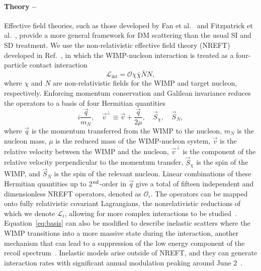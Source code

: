 \paragraph{Theory --\label{sec:theory}}
Effective field theories, such as those developed by Fan et al.~\cite{Fan_2010} and Fitzpatrick et al.~\cite{Fitzpatrick:EFT}, provide a more general framework for DM scattering than the usual SI and SD treatment.
We use the non-relativistic effective field theory (NREFT) developed in Ref.~\cite{Fitzpatrick:EFT}, in which the WIMP-nucleon interaction is treated as a four-particle contact interaction
\begin{equation}
    \mathcal{L}_\text{int} = \mathcal{O}\chi\bar{\chi}\bar{N}N,
\end{equation}
where $\chi$ and $N$ are non-relativistic fields for the WIMP and target nucleon, respectively.
Enforcing momentum conservation and Galilean invariance \cite{Fitzpatrick:EFT}  reduces the operators to a basis of four Hermitian quantities
\begin{equation}
i \frac{\vec{q}}{m_N}, \quad \vec{v}^\perp \equiv \vec{v} + \frac{\vec{q}}{2\mu}, \quad \vec{S}_{\chi}, \quad \vec{S}_{N},
\label{eq:basis}
\end{equation}
where $\vec{q}$ is the momentum transferred from the WIMP to the nucleon, $m_N$ is the nucleon mass, $\mu$ is the reduced mass of the WIMP-nucleon system, $\vec{v}$ is the relative velocity between the WIMP and the nucleon, $\vec{v}^\perp$ is the component of the relative velocity  perpendicular to the momentum transfer, $\vec{S}_{\chi}$ is the spin of the WIMP, and $\vec{S}_{N}$ is the spin of the relevant nucleon. 
Linear combinations of these Hermitian quantities up to 2$^{\rm nd}$-order in $\vec{q}$ give a total of fifteen independent and dimensionless NREFT operators, denoted as $\mathcal{O}_i$. The operators can be mapped onto fully relativistic covariant Lagrangians, the nonrelativistic reductions of which we denote $\mathcal{L}_i$, allowing for more complex interactions to be studied~\cite{PandaX:2023_dm_luminescence,LZ:SR1_NREFT_Lagrangian_2024,Anand:MathematicaEFT}.
Equation~\ref{eq:basis} can also be modified to describe inelastic scatters where the WIMP transitions into a more massive state during the interaction, another mechanism that can lead to a suppression of the low energy component of the recoil spectrum~\cite{Barello_2014}. 
Inelastic models arise outside of NREFT, and they can generate interaction rates with significant annual modulation peaking around June 2~\cite{smith_2021:inelasticDM,Tucker-Smith:inelasticDM,Bramante2016:inelasticDM,Graham:Higgsino_2025,Han_1997}.




